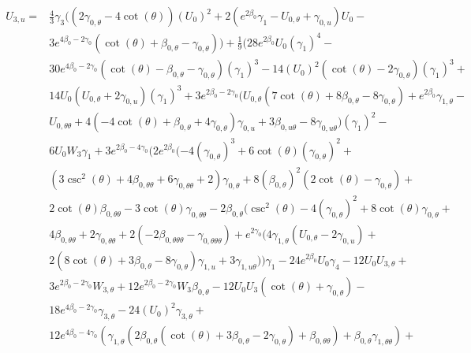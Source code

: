 \documentclass[a4paper,11pt]{article}
\numberwithin{equation}{section}
\begin{document}
\begin{align}  \label{eq: SC1}
\begin{split}
U_{3, u}=& \frac{4}{3} \gamma_{3} ((2\gamma_{0, \theta}-4 \cot (\theta )) (U_{0})^2+2 (e^{2\beta_{0}}\gamma_{1}-U_{0, \theta}+\gamma_{0,u}) U_{0}- \\
&3 e^{4\beta_{0}-2\gamma_{0}} (\cot (\theta )+\beta_{0,\theta}-\gamma_{0,\theta}))+\frac{1}{9} (28 e^{2\beta_{0}} U_{0} (\gamma_{1})^4-\\
&30 e^{4\beta_{0}-2\gamma_{0}} (\cot (\theta )-\beta_{0,\theta}-\gamma_{0,\theta}) (\gamma_{1})^3-14 (U_{0})^2 (\cot (\theta )-2\gamma_{0, \theta}) (\gamma_{1})^3+\\
&14 U_{0} (U_{0, \theta}+2\gamma_{0,u}) (\gamma_{1})^3+3 e^{2\beta_{0}-2\gamma_{0}} (U_{0, \theta} (7 \cot (\theta )+8\beta_{0,\theta}-8\gamma_{0, \theta})+e^{2\beta_{0}}\gamma_{1,\theta}-\\
&U_{0, \theta \theta}+4 (-4 \cot (\theta )+\beta_{0,\theta}+4\gamma_{0, \theta})\gamma_{0,u}+3\beta_{0, u \theta}-8\gamma_{0, u \theta}) (\gamma_{1})^2-\\
&6 U_{0} W_{3}\gamma_{1}+3 e^{2\beta_{0}-4\gamma_{0}} (2 e^{2\beta_{0}} (-4 (\gamma_{0,\theta})^3+6 \cot (\theta ) (\gamma_{0,\theta})^2+\\
&(3 \csc ^2(\theta )+4\beta_{0, \theta \theta}+6\gamma_{0, \theta \theta}+2)\gamma_{0, \theta}+8 (\beta_{0,\theta})^2 (2 \cot (\theta )-\gamma_{0,\theta})+\\
&2 \cot (\theta )\beta_{0, \theta \theta}-3 \cot (\theta )\gamma_{0, \theta \theta}-2\beta_{0,\theta} (\csc ^2(\theta )-4 (\gamma_{0,\theta})^2+8 \cot (\theta )\gamma_{0, \theta}+\\
&4\beta_{0, \theta \theta}+2\gamma_{0, \theta \theta}+2(-2\beta_{0, \theta \theta \theta}-\gamma_{0, \theta \theta \theta})+e^{2\gamma_{0}} (4\gamma_{1,\theta} (U_{0, \theta}-2\gamma_{0,u})+\\
&2 (8 \cot (\theta )+3\beta_{0,\theta}-8\gamma_{0, \theta})\gamma_{1,u}+3\gamma_{1, u \theta}))\gamma_{1}-24 e^{2\beta_{0}} U_{0}\gamma_4-12 U_{0} U_{3, \theta}+\\
&3 e^{2\beta_{0}-2\gamma_{0}} W_{3, \theta}+12 e^{2\beta_{0}-2\gamma_{0}} W_{3}\beta_{0,\theta}-12 U_{0} U_{3} (\cot (\theta )+\gamma_{0,\theta})-\\
&18 e^{4\beta_{0}-2\gamma_{0}} \gamma_{3, \theta}-24 (U_{0})^2 \gamma_{3, \theta}+\\
&12 e^{4\beta_{0}-4\gamma_{0}} (\gamma_{1, \theta} (2\beta_{0,\theta} (\cot (\theta )+3\beta_{0,\theta}-2\gamma_{0, \theta})+\beta_{0, \theta \theta})+\beta_{0,\theta}\gamma_{1, \theta \theta})+\\

\end{split}
\end{align}
\end{document}
